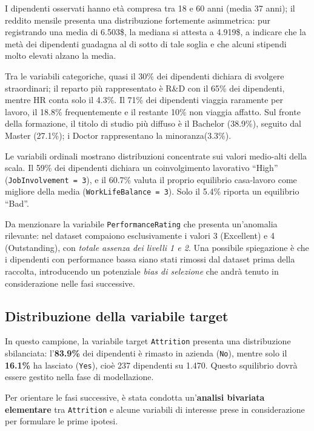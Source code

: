 \documentclass[12pt, a4paper]{article}
\begin{document}
I dipendenti osservati hanno età compresa tra 18 e 60 anni (media 37 anni); il reddito mensile presenta una distribuzione fortemente asimmetrica: pur registrando una media di 6.503\$, la mediana si attesta 
a 4.919\$, a indicare che la metà dei dipendenti guadagna al di sotto di tale soglia e che alcuni stipendi molto elevati alzano la media.

Tra le variabili categoriche, quasi il 30\% dei dipendenti dichiara di svolgere straordinari; il reparto più rappresentato è R\&D con il 65\% dei dipendenti, mentre HR conta solo il 4.3\%. Il 71\% dei dipendenti viaggia raramente per lavoro, il 18.8\% frequentemente e il restante 10\% non viaggia affatto. Sul fronte della formazione, il titolo di studio più diffuso è il Bachelor (38.9\%), seguito dal 
Master (27.1\%); i Doctor rappresentano la minoranza(3.3\%).

Le variabili ordinali mostrano distribuzioni concentrate sui valori medio-alti della scala. Il 59\% dei dipendenti dichiara un coinvolgimento lavorativo ``High'' (\texttt{JobInvolvement = 3}), e il 60.7\% valuta il proprio equilibrio casa-lavoro come migliore della media (\texttt{WorkLifeBalance = 3}). 
Solo il 5.4\% riporta un equilibrio ``Bad''.

Da menzionare la variabile \texttt{PerformanceRating} che presenta un'anomalia rilevante: 
nel dataset compaiono esclusivamente i valori 3 (Excellent) e 4 (Outstanding), con \textit{totale assenza dei livelli 1 e 2}. Una possibile spiegazione è che i dipendenti con performance bassa siano stati 
rimossi dal dataset prima della raccolta, introducendo un potenziale 
\textit{bias di selezione} che andrà tenuto in considerazione nelle fasi successive. 

\subsection{Distribuzione della variabile target}
 
In questo campione, la variabile target \texttt{Attrition} presenta una distribuzione sbilanciata: l'\textbf{83.9\%} dei dipendenti è rimasto in azienda (\texttt{No}), mentre solo il \textbf{16.1\%} ha lasciato (\texttt{Yes}), cioè 237 dipendenti su 1.470. Questo squilibrio dovrà essere gestito nella fase di modellazione.
 
Per orientare le fasi successive, è stata condotta un'\textbf{analisi bivariata elementare} tra \texttt{Attrition} e alcune variabili di interesse prese in considerazione per formulare le prime ipotesi.
 
\end{document}
